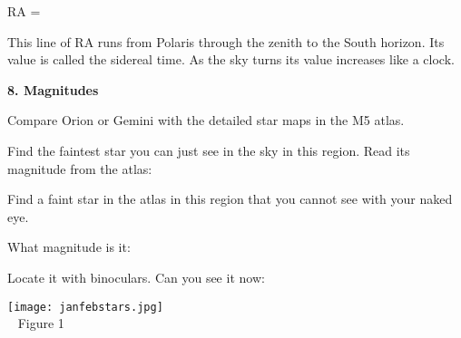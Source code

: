 \documentclass[12pt]{article}
\begin{document}
\medskip
{\hfill RA = \makebox[4cm]{\hrulefill} \hfill }

\medskip
This line of RA runs from Polaris through the zenith to the South
horizon. Its value is called the sidereal time. As the sky turns its
value increases like a clock. 

\bigskip\noindent
{\bf 8. Magnitudes}

\bigskip\noindent Compare Orion
or Gemini with the detailed star maps
in the M5 atlas.

Find the faintest star you can just see in the sky in this region. Read its
magnitude from the atlas:  \makebox[4cm]{\hrulefill}

\smallskip\noindent
Find a faint star in the atlas in this region that you cannot see with
your naked eye.
 
What magnitude is it: \makebox[4cm]{\hrulefill}
 
Locate it with binoculars. Can you see it now: \makebox[4cm]{\hrulefill}

\newpage
\texttt{[image: janfebstars.jpg]}\\
{~ \hfill Figure 1 \hfill ~}
\end{document}
